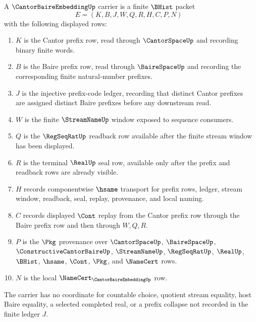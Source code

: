 \begin{definition}
\label{def:cantor-baire-embedding-carrier}
A $\CantorBaireEmbeddingUp$ carrier is a finite $\BHist$ packet
$$
E=(K,B,J,W,Q,R,H,C,P,N)
$$
with the following displayed rows:
\begin{enumerate}
\item $K$ is the Cantor prefix row, read through $\CantorSpaceUp$ and recording binary finite words.
\item $B$ is the Baire prefix row, read through $\BaireSpaceUp$ and recording the corresponding finite natural-number prefixes.
\item $J$ is the injective prefix-code ledger, recording that distinct Cantor prefixes are assigned distinct Baire prefixes before any downstream read.
\item $W$ is the finite $\StreamNameUp$ window exposed to sequence consumers.
\item $Q$ is the $\RegSeqRatUp$ readback row available after the finite stream window has been displayed.
\item $R$ is the terminal $\RealUp$ seal row, available only after the prefix and readback rows are already visible.
\item $H$ records componentwise $\hsame$ transport for prefix rows, ledger, stream window, readback, seal, replay, provenance, and local naming.
\item $C$ records displayed $\Cont$ replay from the Cantor prefix row through the Baire prefix row and then through $W,Q,R$.
\item $P$ is the $\Pkg$ provenance over $\CantorSpaceUp$, $\BaireSpaceUp$, $\ConstructiveCantorBaireUp$, $\StreamNameUp$, $\RegSeqRatUp$, $\RealUp$, $\BHist$, $\hsame$, $\Cont$, $\Pkg$, and $\NameCert$ rows.
\item $N$ is the local $\NameCert_{\CantorBaireEmbeddingUp}$ row.
\end{enumerate}
The carrier has no coordinate for countable choice, quotient stream equality, host Baire equality, a selected completed real, or a prefix collapse not recorded in the finite ledger $J$.
\end{definition}

